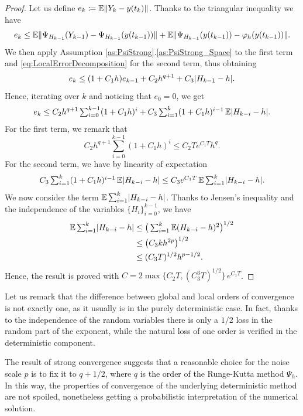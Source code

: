 \documentclass{siamart1116}
\numberwithin{theorem}{section}
\DeclarePairedDelimiter{\abs}{\lvert}{\rvert}
\DeclarePairedDelimiter{\norm}{\|}{\|}
\renewcommand{\phi}{\varphi}
\newcommand{\defeq}{\coloneqq}
\newcommand{\E}{\operatorname{\mathbb{E}}}
\newcommand{\sksum}{\textstyle\sum}
\begin{document}
\begin{proof} Let us define $e_k \defeq \E\norm{Y_k - y(t_k)}$. Thanks to the triangular inequality we have
	\begin{equation}
		e_k \leq \E\norm{\Psi_{H_{k-1}}(Y_{k-1}) - \Psi_{H_{k-1}}(y(t_{k-1}))} + \E\norm{\Psi_{H_{k-1}}(y(t_{k-1})) - \phi_{h}(y(t_{k-1}))}.
	\end{equation}
	 We then apply Assumption \ref{as:PsiStrong}.\ref{as:PsiStrong_Space} to the first term and \eqref{eq:LocalErrorDecomposition}  for the second term, thus obtaining
	\begin{equation}
		e_k \leq (1 + C_1h) e_{k - 1} + C_2 h^{q + 1} + C_3 \abs{H_{k-1} - h}.
	\end{equation}
	Hence, iterating over $k$ and noticing that $e_0 = 0$, we get
	\begin{equation}
		e_k \leq C_2 h^{q + 1} \sksum_{i=0}^{k-1} (1 + C_1h)^i + C_3 \sksum_{i=1}^{k} (1 + C_1h)^{i-1}\E\abs{H_{k-i} - h}.
	\end{equation}
	For the first term, we remark that
	\begin{equation}
		C_2 h^{q + 1} \sksum_{i=0}^{k-1} (1 + C_1h)^i \leq C_2Te^{C_1T}h^{q}.
	\end{equation}
	For the second term, we have by linearity of expectation
	\begin{equation}
		C_3 \sksum_{i=1}^{k} (1 + C_1h)^{i-1}\E\abs{H_{k-i} - h} \leq C_3 e^{C_1 T} \E \sksum_{i=1}^k \abs{H_{k-i} - h}.
	\end{equation}
	We now consider the term $\E \sksum_{i=1}^k \abs{H_{k-i} - h}$. Thanks to Jensen's inequality and the independence of the variables $\{H_i\}_{i=0}^{k-1}$, we have
	\begin{equation}
	\begin{aligned}
		\E \sksum_{i=1}^k \abs{H_{k-i} - h} &\leq \big(\sksum_{i=1}^k \E(H_{k-i} - h)^2\big)^{1/2} \\
		&\leq \big(C_3 k h^{2p}\big)^{1/2} \\
	    &\leq (C_3T)^{1/2} h^{p - 1/2}.
	\end{aligned}
	\end{equation}
	Hence, the result is proved with $C = 2\max\{C_2T, (C_3^3T)^{1/2}\}\,e^{C_1T}$.
\end{proof}

\begin{remark} Let us remark that the difference between global and local orders of convergence is not exactly one, as it usually is in the purely deterministic case. In fact, thanks to the independence of the random variables there is only a $1/2$ loss in the random part of the exponent, while the natural loss of one order is verified in the deterministic component.
\end{remark}
\begin{remark} The result of strong convergence suggests that a reasonable choice for the noise scale $p$ is to fix it to  $q + 1/2$, where $q$ is the order of the Runge-Kutta method $\Psi_h$. In this way, the properties of convergence of the underlying deterministic method are not spoiled, nonetheless getting a probabilistic interpretation of the numerical solution.
\end{remark}
\end{document}

